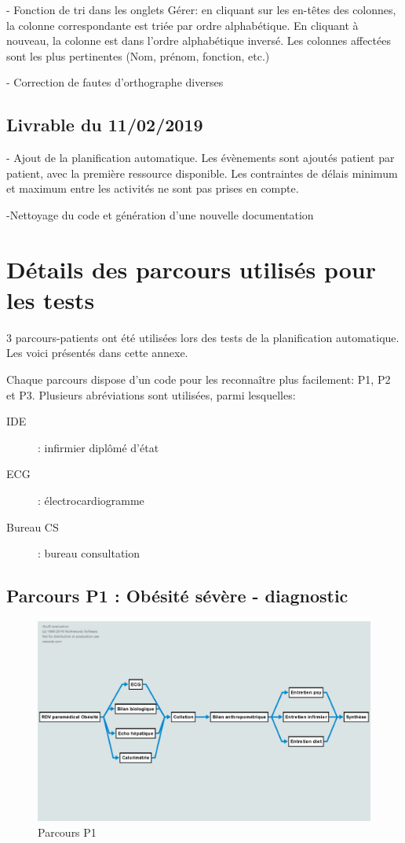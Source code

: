 \documentclass[noposter]{polytech/polytech}
\begin{document}
- Fonction de tri dans les onglets Gérer: en cliquant sur les en-têtes des colonnes, la colonne correspondante est triée par ordre alphabétique. En cliquant à nouveau, la colonne est dans l'ordre alphabétique inversé. Les colonnes affectées sont les plus pertinentes (Nom, prénom, fonction, etc.)

- Correction de fautes d'orthographe diverses

\section{Livrable du 11/02/2019}

- Ajout de la planification automatique. Les évènements sont ajoutés patient par patient, avec la première ressource disponible. Les contraintes de délais minimum et maximum entre les activités ne sont pas prises en compte.

-Nettoyage du code et génération d'une nouvelle documentation


\chapter{Détails des parcours utilisés pour les tests}
\label{ann:parcours}

3 parcours-patients ont été utilisées lors des tests de la planification automatique. Les voici présentés dans cette annexe. 

Chaque parcours dispose d'un code pour les reconnaître plus facilement: P1, P2 et P3. Plusieurs abréviations sont utilisées, parmi lesquelles:

\begin{description}
	\item[IDE] : infirmier diplômé d'état
	\item[ECG] : électrocardiogramme
	\item[Bureau CS] : bureau consultation
\end{description}


\section{Parcours P1 : Obésité sévère - diagnostic}

\begin{figure}
	\includegraphics[scale=0.35]{images/parcoursP1}
	\caption{Parcours P1}
	\label{fig:P1}
\end{figure}
\end{document}
